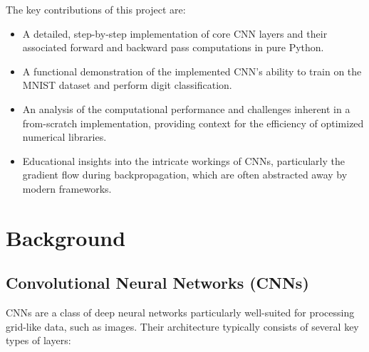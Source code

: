 \documentclass[conference]{IEEEtran}
\begin{document}
The key contributions of this project are:
\begin{itemize}
    \item A detailed, step-by-step implementation of core CNN layers and their associated forward and backward pass computations in pure Python.
    \item A functional demonstration of the implemented CNN's ability to train on the MNIST dataset and perform digit classification.
    \item An analysis of the computational performance and challenges inherent in a from-scratch implementation, providing context for the efficiency of optimized numerical libraries.
    \item Educational insights into the intricate workings of CNNs, particularly the gradient flow during backpropagation, which are often abstracted away by modern frameworks.
\end{itemize}


\section{Background}
\subsection{Convolutional Neural Networks (CNNs)}
CNNs are a class of deep neural networks particularly well-suited for processing grid-like data, such as images. Their architecture typically consists of several key types of layers:
\end{document}

